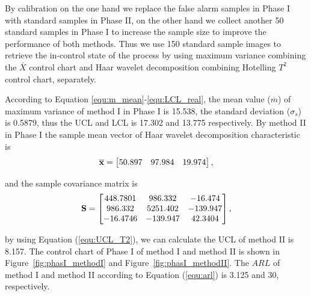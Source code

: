  By calibration on the one hand we replace the false alarm samples in Phase I with standard samples in Phase II, on the other hand we collect another 50 standard samples in Phase I to increase the sample size to improve the performance of both methods. Thus we use 150 standard sample images to retrieve the in-control state of the process by using maximum variance combining the $\bar{X}$ control chart and Haar wavelet decomposition combining Hotelling $T^{2}$ control chart, separately. 

According to Equation \eqref{equ:m_mean}-\eqref{equ:LCL_real}, the mean value ($\overline{m}$) of maximum variance of method I in Phase I is 15.538, the standard deviation ($\sigma_{s}$) is 0.5879, thus the UCL and LCL is 17.302 and 13.775 respectively. By method II in Phase I the sample mean vector of Haar wavelet decomposition characteristic is
\begin{equation}
\centering
\overline{\mathbf{x}} = 
\begin{bmatrix}
50.897 & 97.984 & 19.974
\end{bmatrix}, 
\end{equation}


and the sample covariance matrix is
\begin{equation}
\centering
\mathbf{S} = 
\begin{bmatrix}

448.7801 &	986.332 &	-16.474\\
986.332 &	5251.402 &	-139.947\\
-16.4746 &	-139.947 &	42.3404
\end{bmatrix},
\end{equation}

by using Equation (\ref{equ:UCL_T2}), we can calculate the UCL of method II is 8.157. The control chart of Phase I of method I and method II is shown in Figure~\ref{fig:phasI_methodI} and Figure~\ref{fig:phasI_methodII}. The $ARL$ of method I and method II according to Equation (\ref{equ:arl}) is 3.125 and 30, respectively. 

